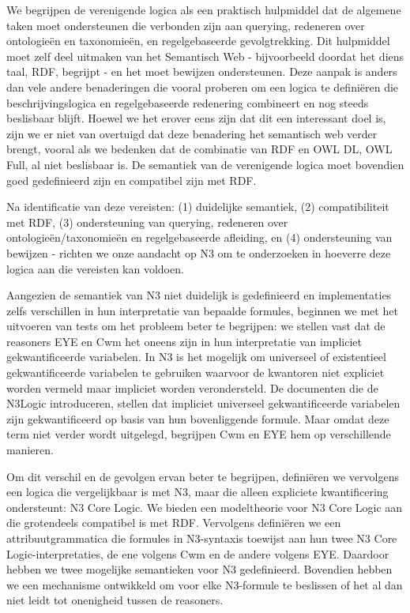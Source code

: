 We begrijpen de verenigende logica als een praktisch
hulpmiddel dat de algemene taken moet ondersteunen die verbonden zijn aan querying, redeneren
over ontologieën en taxonomieën, en regelgebaseerde gevolgtrekking. Dit hulpmiddel moet zelf deel
uitmaken van het Semantisch Web - bijvoorbeeld doordat het diens taal, RDF, begrijpt - en het moet
bewijzen ondersteunen. Deze aanpak is anders dan vele andere benaderingen die vooral
proberen om een logica te definiëren die beschrijvingslogica en regelgebaseerde redenering
combineert en nog steeds beslisbaar blijft. Hoewel we het erover eens zijn dat dit een interessant
doel is, zijn we er niet van overtuigd dat deze benadering het semantisch web verder brengt, vooral
als we bedenken dat de combinatie van RDF en OWL DL, OWL Full, al niet beslisbaar is. De semantiek
van de verenigende logica moet bovendien goed gedefinieerd zijn en compatibel zijn met RDF.

Na identificatie van deze vereisten: (1) duidelijke semantiek, (2) compatibiliteit met RDF, (3)
ondersteuning van querying, redeneren over ontologieën/taxonomieën en regelgebaseerde afleiding,
en (4) ondersteuning van bewijzen - richten we onze aandacht op N3 om te onderzoeken in hoeverre
deze logica aan die vereisten kan voldoen.

Aangezien de semantiek van N3 niet duidelijk is gedefinieerd en implementaties zelfs verschillen in
hun interpretatie van bepaalde formules, beginnen we met het uitvoeren van tests om het probleem beter
te begrijpen: we stellen vast dat de reasoners EYE en Cwm het oneens zijn in hun interpretatie van
impliciet gekwantificeerde variabelen. In N3 is het mogelijk om universeel of existentieel
gekwantificeerde variabelen te gebruiken waarvoor de kwantoren niet expliciet worden vermeld
maar impliciet worden verondersteld. De documenten die de N3Logic introduceren, stellen dat impliciet universeel gekwantificeerde variabelen zijn gekwantificeerd op basis van hun
bovenliggende formule. Maar omdat deze term niet verder wordt uitgelegd, begrijpen Cwm en EYE
hem op verschillende manieren.

Om dit verschil en de gevolgen ervan beter te begrijpen, definiëren we vervolgens een logica die
vergelijkbaar is met N3, maar die alleen expliciete kwantificering ondersteunt: N3 Core Logic. We
bieden een modeltheorie voor N3 Core Logic aan die grotendeels compatibel is met RDF. Vervolgens
definiëren we een attribuutgrammatica die formules in N3-syntaxis toewijst aan hun twee N3 Core
Logic-interpretaties, de ene volgens Cwm en de andere volgens EYE. Daardoor hebben we twee
mogelijke semantieken voor N3 gedefinieerd. Bovendien hebben we een mechanisme ontwikkeld om
voor elke N3-formule te beslissen of het al dan niet leidt tot onenigheid tussen de reasoners.

